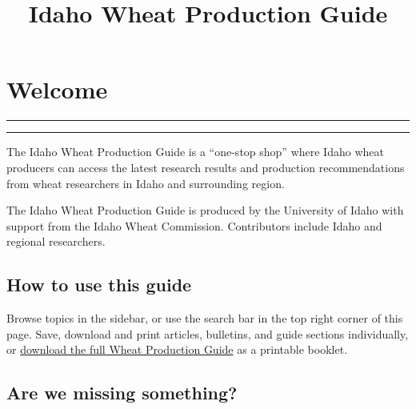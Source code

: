 \documentclass[
  letterpaper,
  DIV=11,
  numbers=noendperiod]{scrreprt}
\title{Idaho Wheat Production Guide}
\author{}
\date{}
\renewcommand*\contentsname{Table of contents}
\newcommand\contentsname{Table of contents}
\begin{document}
\maketitle

\renewcommand*\contentsname{Table of contents}
{
\hypersetup{linkcolor=}
\setcounter{tocdepth}{2}
\tableofcontents
}


\chapter*{Welcome}\label{welcome}


\begin{center}\rule{0.5\linewidth}{0.5pt}\end{center}

\begin{center}\rule{0.5\linewidth}{0.5pt}\end{center}

The Idaho Wheat Production Guide is a ``one-stop shop'' where Idaho
wheat producers can access the latest research results and production
recommendations from wheat researchers in Idaho and surrounding region.

The Idaho Wheat Production Guide is produced by the University of Idaho
with support from the Idaho Wheat Commission. Contributors include Idaho
and regional researchers.

\section*{How to use this guide}\label{how-to-use-this-guide}


Browse topics in the sidebar, or use the search bar in the top right
corner of this page. Save, download and print articles, bulletins, and
guide sections individually, or \href{}{download the full Wheat
Production Guide} as a printable booklet.

\section*{Are we missing something?}\label{are-we-missing-something}
\end{document}
